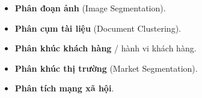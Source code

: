 \begin{ynghia}[title={Ứng dụng}]
\begin{itemize}
  \item \textbf{Phân đoạn ảnh} (Image Segmentation).
  \item \textbf{Phân cụm tài liệu} (Document Clustering).
  \item \textbf{Phân khúc khách hàng} / hành vi khách hàng.
  \item \textbf{Phân khúc thị trường} (Market Segmentation).
  \item \textbf{Phân tích mạng xã hội}.
\end{itemize}
\end{ynghia}
